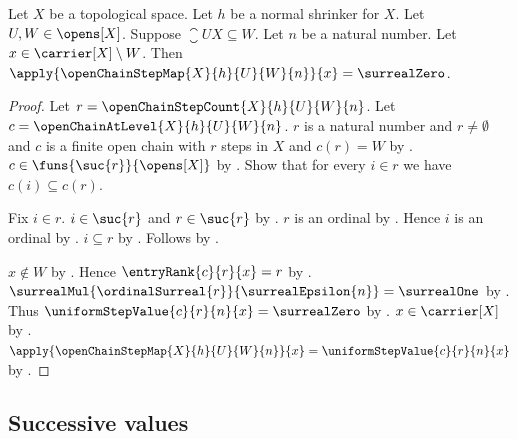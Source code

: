 \begin{proposition}\label{open_chain_step_map_zero_outside_last}
    Let $X$ be a topological space.
    Let $h$ be a normal shrinker for $X$.
    Let $U,W\in\opens[X]$.
    Suppose $\closure{U}{X}\subseteq W$.
    Let $n$ be a natural number.
    Let $x\in\carrier[X]\setminus W$.
    Then $\apply{\openChainStepMap{X}{h}{U}{W}{n}}{x}=\surrealZero$.
\end{proposition}
\begin{proof}
    Let $r=\openChainStepCount{X}{h}{U}{W}{n}$.
    Let $c=\openChainAtLevel{X}{h}{U}{W}{n}$.
    $r$ is a natural number and $r\neq\emptyset$ and
        $c$ is a finite open chain with $r$ steps in $X$ and
        $c(r)=W$
        by .
    $c\in\funs{\suc{r}}{\opens[X]}$
        by .
    Show that for every $i\in r$ we have $c(i)\subseteq c(r)$.
    \begin{subproof}
        Fix $i\in r$.
        $i\in\suc{r}$ and $r\in\suc{r}$
            by .
        $r$ is an ordinal by .
        Hence $i$ is an ordinal by .
        $i\subseteq r$
            by .
        Follows by .
    \end{subproof}
    $x\notin W$ by .
    Hence $\entryRank{c}{r}{x}=r$
        by .
    $\surrealMul{\ordinalSurreal{r}}{\surrealEpsilon{n}}
        =\surrealOne$ by .
    Thus $\uniformStepValue{c}{r}{n}{x}=\surrealZero$
        by .
    $x\in\carrier[X]$ by .
    $\apply{\openChainStepMap{X}{h}{U}{W}{n}}{x}
        =\uniformStepValue{c}{r}{n}{x}$
        by .
\end{proof}

\subsection{Successive values}

